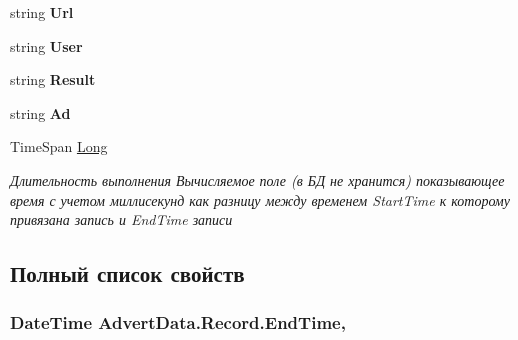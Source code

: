 \begin{DoxyCompactItemize}
\item 
\hypertarget{class_advert_data_1_1_record_a656bf22e79ae5d9e8233ec11e6ea90e4}{string {\bfseries Url}}\label{class_advert_data_1_1_record_a656bf22e79ae5d9e8233ec11e6ea90e4}

\item 
\hypertarget{class_advert_data_1_1_record_a40a5c9475b9ec1a1e821720ba68728ef}{string {\bfseries User}}\label{class_advert_data_1_1_record_a40a5c9475b9ec1a1e821720ba68728ef}

\item 
\hypertarget{class_advert_data_1_1_record_a76cc6b5916a7ccbbf5d784fbb7ef1b0d}{string {\bfseries Result}}\label{class_advert_data_1_1_record_a76cc6b5916a7ccbbf5d784fbb7ef1b0d}

\item 
\hypertarget{class_advert_data_1_1_record_a9c0f5e6a909f0cb90df6af7e7af35300}{string {\bfseries Ad}}\label{class_advert_data_1_1_record_a9c0f5e6a909f0cb90df6af7e7af35300}

\item 
Time\+Span \hyperlink{class_advert_data_1_1_record_a43cfdb4200976b189f903bda0f0fd7e0}{Long}
\begin{DoxyCompactList}\small\item\em Длительность выполнения Вычисляемое поле (в БД не хранится) показывающее время с учетом миллисекунд как разницу между временем Start\+Time к которому привязана запись и End\+Time записи \end{DoxyCompactList}\end{DoxyCompactItemize}


\subsection{Полный список свойств}
\hypertarget{class_advert_data_1_1_record_ac343c5c1188872cd97e8394bd55e5631}{
\subsubsection[{End\+Time}]{\setlength{\rightskip}{0pt plus 5cm}Date\+Time Advert\+Data.\+Record.\+End\+Time\hspace{0.3cm}{\ttfamily [get]}, {\ttfamily [set]}}}\label{class_advert_data_1_1_record_ac343c5c1188872cd97e8394bd55e5631}


